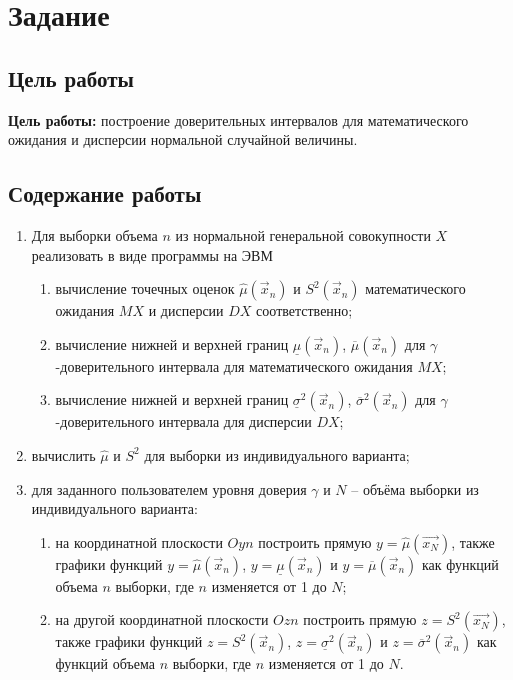 \documentclass[12pt]{report}
\begin{document}


\chapter{Задание}

\section{Цель работы}

\textbf{Цель работы:} построение доверительных интервалов для математического ожидания и дисперсии нормальной случайной величины.

\section{Содержание работы}

\begin{enumerate}
    \item Для выборки объема $n$ из нормальной генеральной совокупности $X$ реализовать в виде программы на ЭВМ
        \begin{enumerate}
            \item вычисление точечных оценок $\hat\mu(\vec x_n)$ и $S^2(\vec x_n)$ математического ожидания $MX$ и дисперсии $DX$ соответственно;
            \item вычисление нижней и верхней границ $\underline\mu(\vec x_n)$, $\overline\mu(\vec x_n)$ для $\gamma$-доверительного интервала для математического ожидания $MX$;
            \item вычисление нижней и верхней границ $\underline\sigma^2(\vec x_n)$, $\overline\sigma^2(\vec x_n)$ для $\gamma$-доверительного интервала для дисперсии $DX$;
        \end{enumerate}
    \item вычислить $\hat\mu$ и $S^2$ для выборки из индивидуального варианта;
    \item для заданного пользователем уровня доверия $\gamma$ и $N$ – объёма выборки из индивидуального варианта:
        \begin{enumerate}
            \item на координатной плоскости $Oyn$ построить прямую $y = \hat\mu(\vec{x_N})$, также графики функций $y = \hat\mu(\vec x_n)$, $y = \underline\mu(\vec x_n)$ и $y = \overline\mu(\vec x_n)$ как функций объема $n$ выборки, где $n$ изменяется от 1 до $N$;
            \item на другой координатной плоскости $Ozn$ построить прямую $z = S^2(\vec{x_N})$, также графики функций $z = S^2(\vec x_n)$, $z = \underline\sigma^2(\vec x_n)$ и $z = \overline\sigma^2(\vec x_n)$ как функций объема $n$ выборки, где $n$ изменяется от 1 до $N$.
        \end{enumerate}
\end{enumerate}
\end{document}
